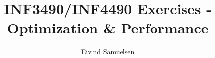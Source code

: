 
\title{\vspace{-2cm}INF3490/INF4490 Exercises - Optimization & Performance}
\author{Eivind Samuelsen}
\date{}

\setlength\parindent{0pt}


    \renewcommand\marginsymbol[1][0pt]{%
  \tabto*{0cm}\makebox[-1cm][c]{$\mathbb{P}$}\tabto*{\TabPrevPos}}

\maketitle


